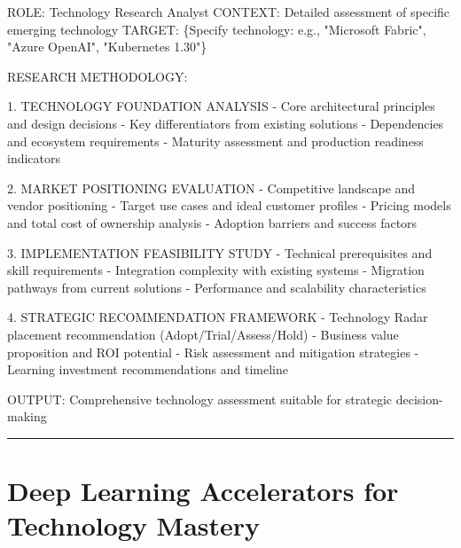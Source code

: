 \documentclass[
  letterpaper,
  DIV=11,
  numbers=noendperiod]{scrartcl}
\newenvironment{Shaded}{\begin{snugshade}}{\end{snugshade}}
\newcommand{\NormalTok}[1]{\textcolor[rgb]{0.00,0.23,0.31}{#1}}
\begin{document}
\begin{Shaded}
\begin{Highlighting}[]
\NormalTok{ROLE: Technology Research Analyst}
\NormalTok{CONTEXT: Detailed assessment of specific emerging technology}
\NormalTok{TARGET: \{Specify technology: e.g., "Microsoft Fabric", "Azure OpenAI", "Kubernetes 1.30"\}}

\NormalTok{RESEARCH METHODOLOGY:}

\NormalTok{1. TECHNOLOGY FOUNDATION ANALYSIS}
\NormalTok{   {-} Core architectural principles and design decisions}
\NormalTok{   {-} Key differentiators from existing solutions}
\NormalTok{   {-} Dependencies and ecosystem requirements}
\NormalTok{   {-} Maturity assessment and production readiness indicators}

\NormalTok{2. MARKET POSITIONING EVALUATION}
\NormalTok{   {-} Competitive landscape and vendor positioning}
\NormalTok{   {-} Target use cases and ideal customer profiles}
\NormalTok{   {-} Pricing models and total cost of ownership analysis}
\NormalTok{   {-} Adoption barriers and success factors}

\NormalTok{3. IMPLEMENTATION FEASIBILITY STUDY}
\NormalTok{   {-} Technical prerequisites and skill requirements}
\NormalTok{   {-} Integration complexity with existing systems}
\NormalTok{   {-} Migration pathways from current solutions}
\NormalTok{   {-} Performance and scalability characteristics}

\NormalTok{4. STRATEGIC RECOMMENDATION FRAMEWORK}
\NormalTok{   {-} Technology Radar placement recommendation (Adopt/Trial/Assess/Hold)}
\NormalTok{   {-} Business value proposition and ROI potential}
\NormalTok{   {-} Risk assessment and mitigation strategies}
\NormalTok{   {-} Learning investment recommendations and timeline}

\NormalTok{OUTPUT: Comprehensive technology assessment suitable for strategic decision{-}making}
\end{Highlighting}
\end{Shaded}

\begin{center}\rule{0.5\linewidth}{0.5pt}\end{center}

\section{Deep Learning Accelerators for Technology
Mastery}\label{deep-learning-accelerators-for-technology-mastery}
\end{document}
